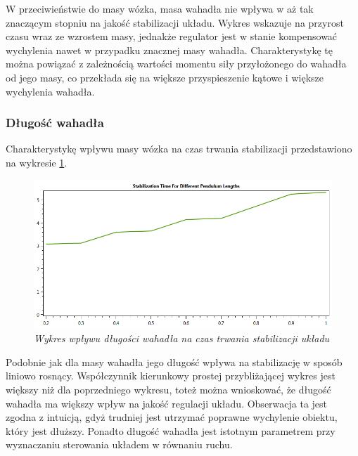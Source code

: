 \documentclass[12pt, oneside]{report}
\theoremstyle{definition}
\begin{document}
W przeciwieństwie do masy wózka, masa wahadła nie wpływa w aż tak znaczącym stopniu na jakość stabilizacji układu. Wykres wskazuje na przyrost czasu wraz ze wzrostem masy, jednakże regulator jest w stanie kompensować wychylenia nawet w przypadku znacznej masy wahadła. Charakterystykę tę można powiązać z zależnością wartości momentu siły przyłożonego do wahadła od jego masy, co przekłada się na większe przyspieszenie kątowe i większe wychylenia wahadła.

\subsubsection{Długość wahadła}
Charakterystykę wpływu masy wózka na czas trwania stabilizacji przedstawiono na wykresie \ref{plot:PendulumLengthQuality}.
\begin{figure}[H]
	\centering
		\includegraphics[width = 350pt]{PendulumLengthQuality} 
		\caption{\textit{Wykres wpływu długości wahadła na czas trwania stabilizacji układu}}
		\label{plot:PendulumLengthQuality}
\end{figure}

Podobnie jak dla masy wahadła jego długość wpływa na stabilizację w sposób liniowo rosnący. Współczynnik kierunkowy prostej przybliżającej wykres jest większy niż dla poprzedniego wykresu, toteż można wnioskować, że długość wahadła ma większy wpływ na jakość regulacji układu. Obserwacja ta jest zgodna z intuicją, gdyż trudniej jest utrzymać poprawne wychylenie obiektu, który jest dłuższy. Ponadto długość wahadła jest istotnym parametrem przy wyznaczaniu sterowania układem w równaniu ruchu. 
\end{document}
